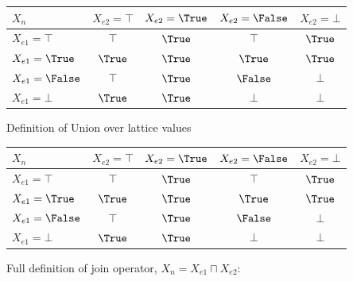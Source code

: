 \REM
{
\begin{figure}%

\begin{center}
\begin{tabular}{|l||c|c|c|c|}
\hline
$X_n$ & $X_{e2} = \top$ & $X_{e2} = \True$ & $X_{e2} = \False$ & $X_{e2} = \bot$ \\
\hline \hline
$X_{e1} = \top$ & $\top$ & $\True$ & $\top$ & $\True$ \\
\hline
$X_{e1} = \True$ & $\True$ & $\True$ & $\True$ & $\True$ \\
\hline
$X_{e1} = \False$ & $\top$ & $\True$ & $\False$ & $\bot$ \\
\hline
$X_{e1} = \bot$ & $\True$ & $\True$ & $\bot$ & $\bot$ \\
\hline
\end{tabular}
\end{center}
\caption{Definition of Union over lattice values}

\label{fig:union}
\end{figure}

\begin{figure}

\begin{center}
\begin{tabular}{|l||c|c|c|c|}
\hline
$X_n$ & $X_{e2} = \top$ & $X_{e2} = \True$ & $X_{e2} = \False$ & $X_{e2} = \bot$ \\
\hline \hline
$X_{e1} = \top$ & $\top$ & $\True$ & $\top$ & $\True$ \\
\hline
$X_{e1} = \True$ & $\True$ & $\True$ & $\True$ & $\True$ \\
\hline
$X_{e1} = \False$ & $\top$ & $\True$ & $\False$ & $\bot$ \\
\hline
$X_{e1} = \bot$ & $\True$ & $\True$ & $\bot$ & $\bot$ \\
\hline
\end{tabular}
\end{center}

\caption{Full definition of join operator, $X_n = X_{e1} \sqcap X_{e2}$:}

\label{fig:full-join}
\end{figure}
}



